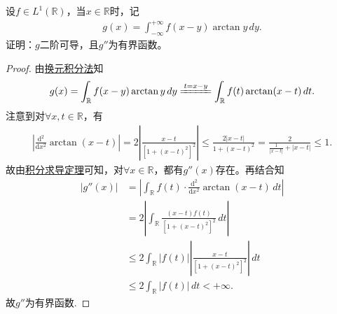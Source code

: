 \documentclass[../../main.tex]{subfiles}%
\begin{document}
\begin{example}
设$f\in L^1(\mathbb{R})$，当$x\in\mathbb{R}$时，记
\begin{align*}
g(x) = \int_{-\infty}^{+\infty} f(x-y) \arctan y \, dy.
\end{align*}
证明：$g$二阶可导，且$g''$为有界函数。
\end{example}
\begin{proof}

由\hyperref[theorem:实变函数--换元积分法]{换元积分法}知
\begin{align*}
g(x) = \int_{\mathbb{R}} f(x-y) \arctan y \, dy \xlongequal{t=x-y} \int_{\mathbb{R}} f(t) \arctan(x-t) \, dt.
\end{align*}
注意到对$\forall x,t\in\mathbb{R}$，有
\begin{align*}
\left| \frac{\mathrm{d}^2}{\mathrm{d}x^2} \arctan(x-t) \right|
= 2\left| \frac{x-t}{\left[1+(x-t)^2\right]^2} \right|
\leqslant \frac{2|x-t|}{1+(x-t)^2}
= \frac{2}{\frac{1}{|x-t|} + |x-t|}
\leqslant 1.
\end{align*}
故由\hyperref[theorem:积分求导定理]{积分求导定理}可知，对$\forall x\in\mathbb{R}$，都有$g''(x)$存在。再结合知
\begin{align*}
|g''(x)|
&= \left| \int_{\mathbb{R}} f(t) \cdot \frac{\mathrm{d}^2}{\mathrm{d}x^2} \arctan(x-t) \, dt \right| \\
&= 2\left| \int_{\mathbb{R}} \frac{(x-t)f(t)}{\left[1+(x-t)^2\right]^2} \, dt \right| \\
&\leqslant 2 \int_{\mathbb{R}} |f(t)| \left| \frac{x-t}{\left[1+(x-t)^2\right]^2} \right| \, dt \\
&\leqslant 2 \int_{\mathbb{R}} |f(t)| \, dt < +\infty.
\end{align*}
故$g''$为有界函数.

\end{proof}
\end{document}
